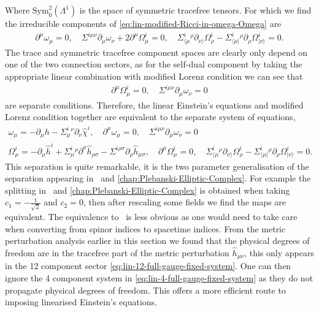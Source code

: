 \documentclass[10pt]{report}
\theoremstyle{definition}
\begin{document}
        Where $\textrm{Sym}_0^2(\Lambda^1)$ is the space of symmetric tracefree tensors. For which we find the irreducible components of \cref{eq:lin-modified-Ricci-in-omega-Omega} are
        \begin{align}
            \partial^\mu \omega_\mu = 0, \quad \Sigma^{i\mu\nu} \partial_\mu \omega_\nu + 2 \partial^\mu \Omega^i_\mu = 0, \quad \Sigma^i_{\langle  \mu}{}^\rho \partial_{\nu \rangle} \Omega^i_\rho - \Sigma^i_{\langle  \mu|}{}^\rho \partial_{\rho} \Omega^i_{|\nu \rangle} = 0.
        \end{align}
        The trace and symmetric tracefree component spaces are clearly only depend on one of the two connection sectors, as for the self-dual component by taking the appropriate linear combination with modified Lorenz condition we can see that
        \begin{align}
            \partial^\mu \Omega^i_\mu = 0, \quad \Sigma^{i\mu\nu} \partial_\mu \omega_\nu = 0
        \end{align}
        are separate conditions. Therefore, the linear Einstein's equations and modified Lorenz condition together are equivalent to the separate system of equations,
        \begin{gather}
            \omega_\mu = -\partial_\mu h - \Sigma^i_\mu{}^\nu \partial_\nu \hat{\chi}^i, \quad \partial^\mu \omega_\mu = 0, \quad \Sigma^{i\mu\nu} \partial_\mu \omega_\nu = 0 \label{eq:lin-4-full-gauge-fixed-system} \\[10pt]
            \Omega^i_\mu = -\partial_\mu \hat{h}^i + \Sigma^i_\mu{}^\rho \partial^\sigma \hat{h}_{\rho\sigma} - \Sigma^{i\rho\sigma} \partial_\rho \hat{h}_{\mu\sigma}, \quad \partial^\mu \Omega^i_\mu = 0, \quad \Sigma^i_{\langle  \mu}{}^\rho \partial_{\nu \rangle} \Omega^i_\rho - \Sigma^i_{\langle  \mu|}{}^\rho \partial_{\rho} \Omega^i_{|\nu \rangle} = 0 \label{eq:lin-12-full-gauge-fixed-system}.
        \end{gather}
        This separation is quite remarkable, it is the two parameter generalisation of the separation appearing in~\cite{ChiralPerturbaKrasno2020,Plebanski_compl_Krasno_2025} and \cref{chap:Plebanski-Elliptic-Complex}. For example the splitting in~\cite{Plebanski_compl_Krasno_2025} and \cref{chap:Plebanski-Elliptic-Complex} is obtained when taking $c_1 = -\frac{1}{\sqrt{2}}$ and $c_2 = 0$, then after rescaling some fields we find the maps are equivalent. The equivalence to~\cite{ChiralPerturbaKrasno2020} is less obvious as one would need to take care when converting from spinor indices to spacetime indices. From the metric perturbation analysis earlier in this section we found that the physical degrees of freedom are in the tracefree part of the metric perturbation $\hat{h}_{\mu\nu}$, this only appears in the 12 component sector \cref{eq:lin-12-full-gauge-fixed-system}. One can then ignore the 4 component system in \cref{eq:lin-4-full-gauge-fixed-system} as they do not propagate physical degrees of freedom. This offers a more efficient route to imposing linearised Einstein's equations.
\end{document}
